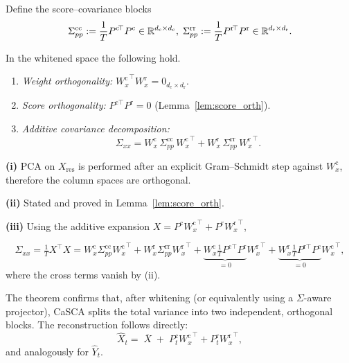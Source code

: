 \documentclass[14pt]{extarticle}
\begin{document}
	Define the score–covariance blocks
	\[
	\Sigma_{pp}^{\mathrm{cc}}
	:=\frac1T P^{\mathrm c\!\top}P^{\mathrm c}\in\mathbb{R}^{d_{\mathrm c}\times d_{\mathrm c}},\;
	\Sigma_{pp}^{\mathrm{rr}}
	:=\frac1T P^{\mathrm r\!\top}P^{\mathrm r}\in\mathbb{R}^{d_{\mathrm r}\times d_{\mathrm r}}.
	\]
	
	\begin{theorem}
		\label{thm:orth_blocks}
		In the whitened space the following hold.
		\begin{enumerate}[label=(\roman*)]
			\item \emph{Weight orthogonality:}
			\({W_x^{\mathrm c}}^{\!\top}W_x^{\mathrm r}=0_{d_{\mathrm c}\times d_{\mathrm r}}\).
			\item \emph{Score orthogonality:}
			\(P^{\mathrm c\!\top}P^{\mathrm r}=0\)  (Lemma~\ref{lem:score_orth}).
			\item \emph{Additive covariance decomposition:}
			\[
			\Sigma_{xx}=W_x^{\mathrm c}\,\Sigma_{pp}^{\mathrm{cc}}\,{W_x^{\mathrm c}}^{\!\top}
			+W_x^{\mathrm r}\,\Sigma_{pp}^{\mathrm{rr}}\,{W_x^{\mathrm r}}^{\!\top}.
			\]
		\end{enumerate}
	\end{theorem}
	
	\begin{Proof}
		\textbf{(i)}  PCA on \(X_{\mathrm{res}}\) is performed after an
		explicit Gram–Schmidt step against \(W_x^{\mathrm c}\), therefore the
		column spaces are orthogonal.
		
		\textbf{(ii)}  Stated and proved in Lemma~\ref{lem:score_orth}.
		
		\textbf{(iii)}  Using the additive expansion
		\(X = P^{\mathrm c}{W_x^{\mathrm c}}^{\!\top} + P^{\mathrm r}{W_x^{\mathrm r}}^{\!\top}\),
		
		\[
		\Sigma_{xx}
		=\tfrac1T X^{\top}X
		= W_x^{\mathrm c}\Sigma_{pp}^{\mathrm{cc}}{W_x^{\mathrm c}}^{\!\top}
		+W_x^{\mathrm r}\Sigma_{pp}^{\mathrm{rr}}{W_x^{\mathrm r}}^{\!\top}
		+\underbrace{W_x^{\mathrm c}
			\tfrac1T P^{\mathrm c\!\top}P^{\mathrm r}}_{=0}
		{W_x^{\mathrm r}}^{\!\top}
		+\underbrace{W_x^{\mathrm r}
			\tfrac1T P^{\mathrm r\!\top}P^{\mathrm c}}_{=0}
		{W_x^{\mathrm c}}^{\!\top},
		\]
		where the cross terms vanish by (ii).
	\end{Proof}
	
	The theorem confirms that, after whitening (or equivalently using a
	$\Sigma$-aware projector), CaSCA splits the total variance into two
	independent, orthogonal blocks.
	The reconstruction follows directly:
	\[
	\widehat X_t
	= \;\overline{X}\;+\;
	P_t^{\mathrm c}{W_x^{\mathrm c}}^{\!\top}
	+P_t^{\mathrm r}{W_x^{\mathrm r}}^{\!\top},
	\]
	and analogously for \(\widehat Y_t\).
	
\end{document}
